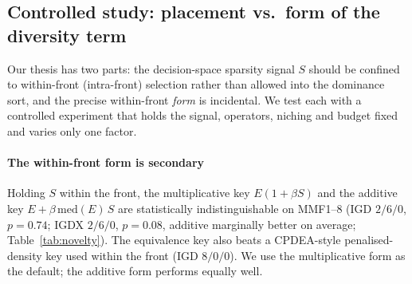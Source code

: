 

\subsection{Controlled study: placement vs.\ form of the diversity term}
\label{sec:novelty}
Our thesis has two parts: the decision-space sparsity signal $S$ should be confined to
within-front (intra-front) selection rather than allowed into the dominance sort, and the precise
within-front \emph{form} is incidental. We test each with a controlled experiment that holds the
signal, operators, niching and budget fixed and varies only one factor.

\paragraph{The within-front form is secondary} Holding $S$ within the front, the multiplicative
key $E(1{+}\beta S)$ and the additive key $E{+}\beta\,\mathrm{med}(E)\,S$ are statistically
indistinguishable on MMF1--8 (IGD $2/6/0$, $p{=}0.74$; IGDX $2/6/0$, $p{=}0.08$, additive
marginally better on average; Table~\ref{tab:novelty}). The equivalence key also beats a
CPDEA-style penalised-density key used within the front (IGD $8/0/0$). We use the
multiplicative form as the default; the additive form performs equally well.

